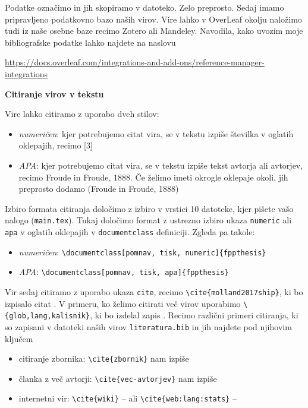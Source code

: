 \documentclass[12pt]{article}
\theoremstyle{definition}
\begin{document}
Podatke označimo in jih skopiramo v datoteko. Zelo preprosto. Sedaj imamo pripravljeno podatkovno bazo naših virov. Vire lahko v OverLeaf okolju naložimo tudi iz naše osebne baze recimo Zotero ali Mandeley. Navodila, kako uvozim moje bibliografske podatke lahko najdete na naslovu

\href{https://docs.overleaf.com/integrations-and-add-ons/reference-manager-integrations}{https://docs.overleaf.com/integrations-and-add-ons/reference-manager-integrations}

\newpage
\textbf{Citiranje virov v tekstu}

Vire lahko citiramo z uporabo dveh stilov:

\begin{itemize}
	\item \emph{numeričen}: kjer potrebujemo citat vira, se v tekstu  izpiše številka v oglatih oklepajih, recimo [3]
	\item \emph{APA}: kjer potrebujemo citat vira, se v tekstu  izpiše tekst avtorja ali avtorjev, recimo Froude in Froude, 1888. Če želimo imeti okrogle oklepaje okoli, jih preprosto dodamo (Froude in Froude, 1888)
\end{itemize}

Izbiro formata citiranja določimo z izbiro v vrstici 10 datoteke, kjer pišete vašo nalogo (\texttt{main.tex}). Tukaj določimo format z ustrezno izbiro ukaza \texttt{numeric} ali \texttt{apa} v oglatih oklepajih v \texttt{documentclass} definiciji. Zgleda pa takole:

\begin{itemize}
	\item \emph{numeričen}: \texttt{\textbackslash documentclass[pomnav, tisk, numeric]\{fppthesis\}}
	\item \emph{APA}: \texttt{\textbackslash documentclass[pomnav, tisk, apa]\{fppthesis\}}
\end{itemize}

Vir sedaj citiramo z uporabo ukaza \texttt{cite}, recimo \texttt{\textbackslash cite\{molland2017ship\}}, ki bo izpisalo citat \cite{molland2017ship}. V primeru, ko želimo citirati več virov uporabimo \texttt{\textbackslash \{glob,lang,kalisnik\}}, ki bo izdelal zapis \cite{glob,lang,kalisnik}. Recimo različni primeri citiranja, ki so zapisani v datoteki naših virov \texttt{literatura.bib} in jih najdete pod njihovim ključem

\begin{itemize}
	\item citiranje zbornika: \texttt{\textbackslash cite\{zbornik\}} nam izpiše \cite{zbornik}
	\item članka z več avtorji: \texttt{\textbackslash cite\{vec-avtorjev\}} nam izpiše \cite{vec-avtorjev}
	\item internetni vir: \texttt{\textbackslash cite\{wiki\}} -- \cite{wiki} ali \texttt{\textbackslash cite\{web:lang:stats\}} -- \cite{web:lang:stats} 
\end{itemize}


\cleardoublepage
\singlespacing
{}
\printbibliography
\end{document}
